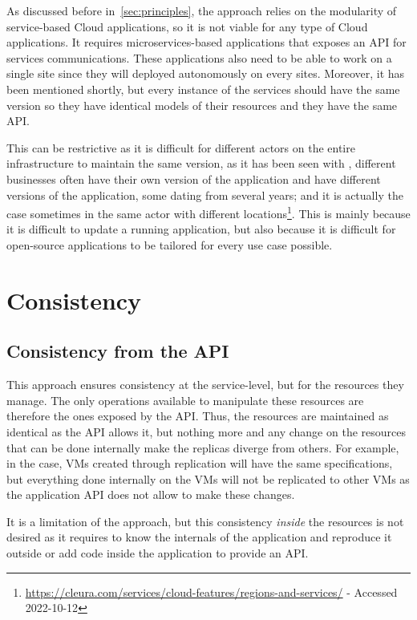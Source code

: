 As discussed before in~\autoref{sec:principles}, the approach
relies on the modularity of service-based Cloud applications, so it is
not viable for any type of Cloud applications.
%
It requires microservices-based applications that exposes an API for
services communications.
%
These applications also need to be able to work on a single site since
they will deployed autonomously on every sites.
%
Moreover, it has been mentioned shortly, but every instance of the
services should have the same version so they have identical models of
their resources and they have the same API.

%
This can be restrictive as it is difficult for different actors on the
entire infrastructure to maintain the same version, as it has been
seen with \os, different businesses often have their own version of
the application and have different versions of the application, some
dating from several years; and it is actually the case sometimes in
the same actor with different
locations\footnote{\url{https://cleura.com/services/cloud-features/regions-and-services/}
  - Accessed 2022-10-12}.
%
This is mainly because it is difficult to update a running
application, but also because it is difficult for open-source
applications to be tailored for every use case possible.


\section{Consistency}

\subsection{Consistency from the API}

This approach ensures consistency at the service-level, but for the
resources they manage.
%
The only operations available to manipulate these resources are
therefore the ones exposed by the API.
%
Thus, the resources are maintained as identical as the API allows it,
but nothing more and any change on the resources that can be done
internally make the replicas diverge from others.
%
For example, in the \os case, VMs created through replication will
have the same specifications, but everything done internally on the
VMs will not be replicated to other VMs as the application API does
not allow to make these changes.

It is a limitation of the approach, but this consistency \emph{inside}
the resources is not desired as it requires to know the internals of
the application and reproduce it outside or add code inside the
application to provide an API.
%

